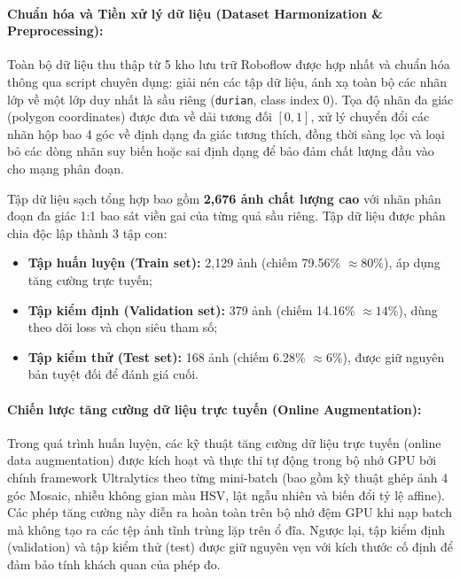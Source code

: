 \documentclass[12pt,a4paper]{article}
\begin{document}
\paragraph{Chuẩn hóa và Tiền xử lý dữ liệu (Dataset Harmonization \& Preprocessing):}
Toàn bộ dữ liệu thu thập từ 5 kho lưu trữ Roboflow được hợp nhất và chuẩn hóa thông qua script chuyên dụng: giải nén các tập dữ liệu, ánh xạ toàn bộ các nhãn lớp về một lớp duy nhất là sầu riêng (\texttt{durian}, class index 0). Tọa độ nhãn đa giác (polygon coordinates) được đưa về dải tương đối $[0, 1]$, xử lý chuyển đổi các nhãn hộp bao 4 góc về định dạng đa giác tương thích, đồng thời sàng lọc và loại bỏ các dòng nhãn suy biến hoặc sai định dạng để bảo đảm chất lượng đầu vào cho mạng phân đoạn.

Tập dữ liệu sạch tổng hợp bao gồm \textbf{2,676 ảnh chất lượng cao} với nhãn phân đoạn đa giác 1:1 bao sát viền gai của từng quả sầu riêng. Tập dữ liệu được phân chia độc lập thành 3 tập con:
\begin{itemize}
    \item \textbf{Tập huấn luyện (Train set):} 2,129 ảnh (chiếm 79.56\% $\approx 80\%$), áp dụng tăng cường trực tuyến;
    \item \textbf{Tập kiểm định (Validation set):} 379 ảnh (chiếm 14.16\% $\approx 14\%$), dùng theo dõi loss và chọn siêu tham số;
    \item \textbf{Tập kiểm thử (Test set):} 168 ảnh (chiếm 6.28\% $\approx 6\%$), được giữ nguyên bản tuyệt đối để đánh giá cuối.
\end{itemize}

\paragraph{Chiến lược tăng cường dữ liệu trực tuyến (Online Augmentation):}
Trong quá trình huấn luyện, các kỹ thuật tăng cường dữ liệu trực tuyến (online data augmentation) được kích hoạt và thực thi tự động trong bộ nhớ GPU bởi chính framework Ultralytics theo từng mini-batch (bao gồm kỹ thuật ghép ảnh 4 góc Mosaic, nhiễu không gian màu HSV, lật ngẫu nhiên và biến đổi tỷ lệ affine). Các phép tăng cường này diễn ra hoàn toàn trên bộ nhớ đệm GPU khi nạp batch mà không tạo ra các tệp ảnh tĩnh trùng lặp trên ổ đĩa. Ngược lại, tập kiểm định (validation) và tập kiểm thử (test) được giữ nguyên vẹn với kích thước cố định để đảm bảo tính khách quan của phép đo.
\end{document}
